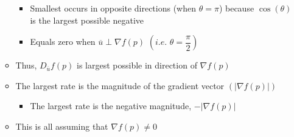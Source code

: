 \begin{itemize}
\begin{itemize}
        \begin{itemize}

          \item Smallest occurs in opposite directions (when $\theta = \pi$) because $\cos(\theta)$ is the largest possible negative

          \item Equals zero when $\overline{u} \perp \nabla f(p)$ $\left(\textit{i.e. } \theta = \dfrac{\pi}{2}\right)$

        \end{itemize}

      \item Thus, $D_{\overline{u}}f(p)$ is largest possible in direction of $\nabla f(p)$

      \item The largest rate is the magnitude of the gradient vector $\left(|\nabla f(p)|\right)$

        \begin{itemize}

          \item The largest rate is the negative magnitude, $-|\nabla f(p)|$

        \end{itemize}

      \item This is all assuming that $\nabla f(p) \neq 0$

    \end{itemize}

\end{itemize}



